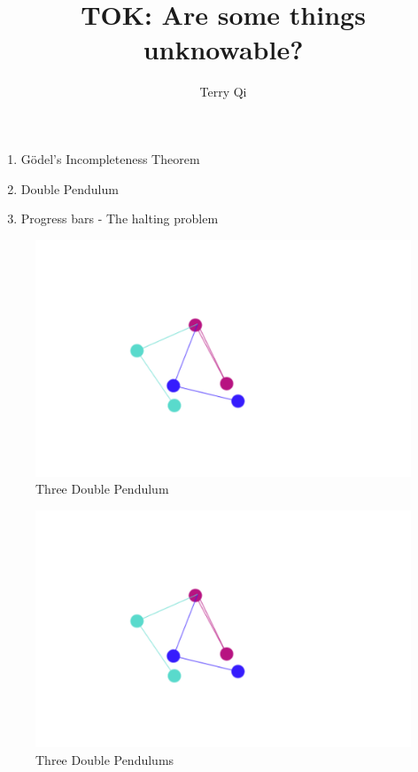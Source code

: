 \documentclass[a4paper,12pt]{article}
\title{TOK: Are some things unknowable?}
\author{Terry Qi}
\begin{document}
\maketitle
\begin{enumerate}
 \item G\"odel's Incompleteness Theorem
 \item Double Pendulum
 \item Progress bars - The halting problem
\end{enumerate}

\begin{figure}[h!]
 \centering
 \includegraphics[scale=0.25]{dpend.png}
 \caption{Three Double Pendulum}
\end{figure}

\begin{figure}[h!]
 \centering
 \includegraphics[scale=0.25]{dpend.png}
 \caption{Three Double Pendulums}
\end{figure}
\end{document}
